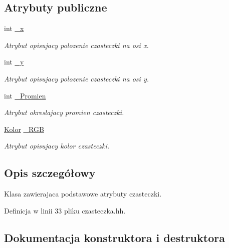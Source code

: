 \subsection*{Atrybuty publiczne}
\begin{DoxyCompactItemize}
\item 
int \hyperlink{class_czasteczka_af809cd4fb1651ebf4b5980ee38c68e58}{\+\_\+x}
\begin{DoxyCompactList}\small\item\em Atrybut opisujacy polozenie czasteczki na osi x. \end{DoxyCompactList}\item 
int \hyperlink{class_czasteczka_a285d25465eee101b6af073809e2fee00}{\+\_\+y}
\begin{DoxyCompactList}\small\item\em Atrybut opisujacy polozenie czasteczki na osi y. \end{DoxyCompactList}\item 
int \hyperlink{class_czasteczka_a5a1d126d89bd571c79a5691c45e2f469}{\+\_\+\+Promien}
\begin{DoxyCompactList}\small\item\em Atrybut okreslajacy promien czasteczki. \end{DoxyCompactList}\item 
\hyperlink{class_kolor}{Kolor} \hyperlink{class_czasteczka_ab9c93cfb3cf0360579ad0def2a94178c}{\+\_\+\+R\+G\+B}
\begin{DoxyCompactList}\small\item\em Atrybut opisujacy kolor czasteczki. \end{DoxyCompactList}\end{DoxyCompactItemize}


\subsection{Opis szczegółowy}
Klasa zawierajaca podstawowe atrybuty czasteczki. 

Definicja w linii 33 pliku czasteczka.\+hh.



\subsection{Dokumentacja konstruktora i destruktora}
\hypertarget{class_czasteczka_a8e8196c934b65fa6a5b37941354ab68d}{}
